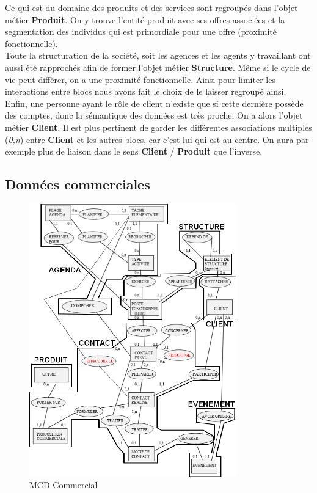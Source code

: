 Ce qui est du domaine des produits et des services sont regroupés dans l'objet métier \textbf{Produit}. On y trouve l'entité produit avec ses offres associées et la segmentation des individus qui est primordiale pour une offre (proximité fonctionnelle). \\

Toute la structuration de la société, soit les agences et les agents y travaillant ont aussi été rapprochés afin de former l'objet métier \textbf{Structure}. Même si le cycle de vie peut différer, on a une proximité fonctionnelle. Ainsi pour limiter les interactions entre blocs nous avons fait le choix de le laisser regroupé ainsi. \\

Enfin, une personne ayant le rôle de client n'existe que si cette dernière possède des comptes, donc la sémantique des données est très proche. On a alors l'objet métier \textbf{Client}. Il est plus pertinent de garder les différentes associations multiples (\textit{0,n}) entre \textbf{Client} et les autres blocs, car c'est lui qui est au centre. On aura par exemple plus de liaison dans le sens \textbf{Client} / \textbf{Produit} que l'inverse.

\subsection{Données commerciales}

\begin{figure}[H]
\centering
\includegraphics[width=0.8\textwidth]{figures/mcd/MCD_Commercial}
\caption{MCD Commercial}
\end{figure}

